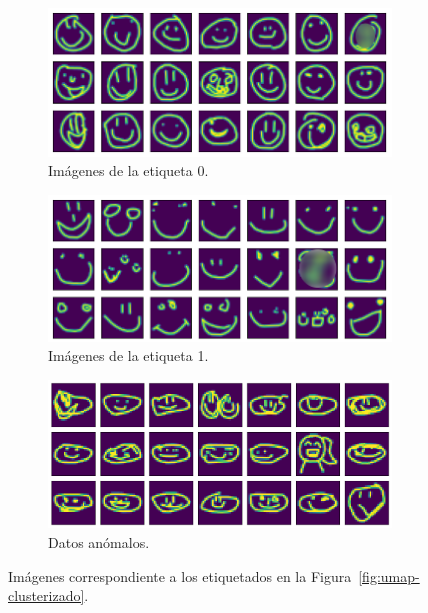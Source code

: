 \begin{figure}[H]
    \centering
    \begin{subfigure}[b]{0.45\textwidth}
        \centering
        \includegraphics[width=\textwidth]{img/cleaning-data/label1.png}
        \caption{Imágenes de la etiqueta 0.}
        \label{fig:label1}
    \end{subfigure}
    \begin{subfigure}[b]{0.45\textwidth}
        \centering
        \includegraphics[width=\textwidth]{img/cleaning-data/label2.png}
        \caption{Imágenes de la etiqueta 1.}
        \label{fig:label2}
    \end{subfigure}
    \begin{subfigure}[b]{0.45\textwidth}
        \centering
        \includegraphics[width=\textwidth]{img/cleaning-data/outliers.png}
        \caption{Datos anómalos.}
        \label{fig:outliers}
    \end{subfigure}
    \caption{Imágenes correspondiente a los etiquetados en la Figura~\ref{fig:umap-clusterizado}.}
    \label{fig:umap-clusters}
\end{figure}

